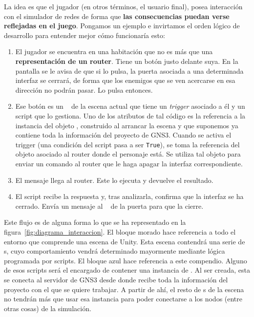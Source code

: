 La idea es que el jugador (en otros términos, el usuario final), posea interacción con el simulador de redes de forma que \textbf{las consecuencias puedan verse reflejadas en el juego}. Pongamos un ejemplo e invirtamos el orden lógico de desarrollo para entender mejor cómo funcionaría esto:

\begin{enumerate}
\item El jugador se encuentra en una habitación que no es más que una \textbf{representación de un router}. Tiene un botón justo delante suya. En la pantalla se le avisa de que si lo pulsa, la puerta asociada a una determinada interfaz se cerrará, de forma que los enemigos que se ven acercarse en esa dirección no podrán pasar. Lo pulsa entonces.
\item Ese botón es un \GAOBJ~ de la escena actual que tiene un \textit{trigger} asociado a él y un script que lo gestiona. Uno de los atributos de tal código es la referencia a la instancia del objeto \GNSCS, construido al arrancar la escena y que suponemos ya contiene toda la información del proyecto de GNS3. Cuando se activa el trigger (una condición del script pasa a ser \texttt{True}), se toma la referencia del objeto asociado al router donde el personaje está. Se utiliza tal objeto para enviar un comando al router que le haga apagar la interfaz correspondiente.
\item El mensaje llega al router. Este lo ejecuta y devuelve el resultado.
\item El script recibe la respuesta y, tras analizarla, confirma que la interfaz se ha cerrado. Envía un mensaje al \GAOBJ~ de la puerta para que la cierre.
\end{enumerate}

Este flujo es de alguna forma lo que se ha representado en la figura~\ref{fig:diagrama_interaccion}. El bloque morado hace referencia a todo el entorno que comprende una escena de Unity. Esta escena contendrá una serie de \GAOBJ s, cuyo comportamiento vendrá determinado mayormente mediante lógica programada por scripts. El bloque azul hace referencia a este compendio. Alguno de esos scripts será el encargado de contener una instancia de \GNSCS . Al ser creada, esta se conecta al servidor de GNS3 desde donde recibe toda la información del proyecto con el que se quiere trabajar. A partir de ahí, el resto de \GAOBJ s de la escena no tendrán más que usar esa instancia para poder conectarse a los nodos (entre otras cosas) de la simulación. 

